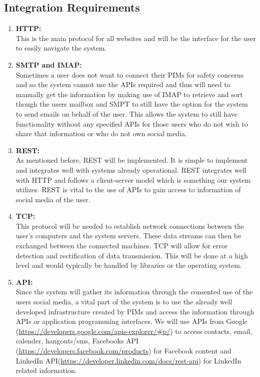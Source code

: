 \documentclass[hidelinks,english]{article}
\begin{document}
		\subsection{Integration Requirements}
			\begin{enumerate}
		        \item \textbf{HTTP:}\\
		            This is the main protocol for all websites and will be the interface for the user to easily navigate the system.
		        \item \textbf{SMTP and IMAP:}\\
		            Sometimes a user does not want to connect their PIMs for safety concerns and so the system cannot use the APIs required and thus will need to manually get the information by making use of IMAP to retrieve and sort though the users mailbox and SMPT to still have the option for the system to send emails on behalf of the user. This allows the system to still have functionality without any specified APIs for those users who do not wish to share that information or who do not own social media.
		        \item \textbf{REST:}\\
		            As mentioned before, REST will be implemented. It is simple to implement and integrates well with systems already operational. REST integrates well with HTTP and follows a client-server model which is something our system utilizes. REST is vital to the use of APIs to gain access to information of social media of the user.
		        \item \textbf{TCP:}\\
		            This protocol will be needed to establish network connections between the user's computers and the system servers. These data streams can then be exchanged between the connected machines. TCP will allow for error detection and rectification of data transmission. This will be done at a high level and would typically be handled by libraries or the operating system.
		        \item \textbf{API:}\\
		            Since the system will gather its information through the consented use of the users social media, a vital part of the system is to use the already well developed infrastructure created by PIMs and access the information through APIs or application programming interfaces. We will use APIs from Google (\sloppy\url{https://developers.google.com/apis-explorer/\#p/}) to access contacts, email, calender, hangouts/sms, Facebooks API (\sloppy\url{https://developers.facebook.com/products}) for Facebook content and LinkedIn API(\sloppy\url{https://developer.linkedin.com/docs/rest-api}) for LinkedIn related information.
	    		\end{enumerate}
		
\end{document}
